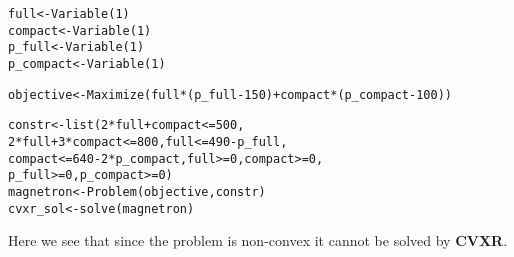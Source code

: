 \documentclass[a4paper]{article}\usepackage[]{graphicx}\usepackage[]{color}
\makeatletter
\newcommand{\hlnum}[1]{\textcolor[rgb]{0,0,0}{#1}}%
\newcommand{\hlopt}[1]{\textcolor[rgb]{0,0,0}{#1}}%
\newcommand{\hlstd}[1]{\textcolor[rgb]{0,0,0}{#1}}%
\newcommand{\hlkwb}[1]{\textcolor[rgb]{0.125,0.537,0.125}{#1}}%
\newcommand{\hlkwd}[1]{\textcolor[rgb]{0,0,0}{#1}}%
\newenvironment{kframe}{%
 \def\at@end@of@kframe{}%
 \ifinner\ifhmode%
  \def\at@end@of@kframe{\end{minipage}}%
  \begin{minipage}{\columnwidth}%
 \fi\fi%
 \def\FrameCommand##1{\hskip\@totalleftmargin \hskip-\fboxsep
 \colorbox{shadecolor}{##1}\hskip-\fboxsep
     \hskip-\linewidth \hskip-\@totalleftmargin \hskip\columnwidth}%
 \MakeFramed {\advance\hsize-\width
   \@totalleftmargin\z@ \linewidth\hsize
   \@setminipage}}%
 {\par\unskip\endMakeFramed%
 \at@end@of@kframe}
\newenvironment{knitrout}{}{} %
\newcommand{\pkg}[1]{\textbf{#1}}
\makeatother
\begin{document}
\begin{knitrout}
\color{fgcolor}\begin{kframe}
\begin{alltt}
\hlstd{full} \hlkwb{<-} \hlkwd{Variable}\hlstd{(}\hlnum{1}\hlstd{)}
\hlstd{compact} \hlkwb{<-} \hlkwd{Variable}\hlstd{(}\hlnum{1}\hlstd{)}
\hlstd{p_full} \hlkwb{<-} \hlkwd{Variable}\hlstd{(}\hlnum{1}\hlstd{)}
\hlstd{p_compact} \hlkwb{<-} \hlkwd{Variable}\hlstd{(}\hlnum{1}\hlstd{)}

\hlstd{objective} \hlkwb{<-} \hlkwd{Maximize}\hlstd{(full} \hlopt{*} \hlstd{(p_full} \hlopt{-} \hlnum{150}\hlstd{)} \hlopt{+} \hlstd{compact} \hlopt{*} \hlstd{(p_compact} \hlopt{-} \hlnum{100}\hlstd{))}
\end{alltt}


{\ttfamily\noindent\color{warningcolor}{\#\# Warning in full * (p\_full - 150): Forming a non-convex expression (affine) * (affine)}}

{\ttfamily\noindent\color{warningcolor}{\#\# Warning in compact * (p\_compact - 100): Forming a non-convex expression (affine) * (affine)}}\begin{alltt}
\hlstd{constr} \hlkwb{<-} \hlkwd{list}\hlstd{(}\hlnum{2} \hlopt{*} \hlstd{full} \hlopt{+} \hlstd{compact} \hlopt{<=} \hlnum{500}\hlstd{,}
    \hlnum{2} \hlopt{*} \hlstd{full} \hlopt{+} \hlnum{3} \hlopt{*} \hlstd{compact} \hlopt{<=} \hlnum{800}\hlstd{, full} \hlopt{<=} \hlnum{490} \hlopt{-} \hlstd{p_full,}
    \hlstd{compact} \hlopt{<=} \hlnum{640} \hlopt{-} \hlnum{2} \hlopt{*} \hlstd{p_compact, full} \hlopt{>=} \hlnum{0}\hlstd{, compact} \hlopt{>=} \hlnum{0}\hlstd{,}
    \hlstd{p_full} \hlopt{>=} \hlnum{0}\hlstd{, p_compact} \hlopt{>=} \hlnum{0}\hlstd{)}
\hlstd{magnetron} \hlkwb{<-} \hlkwd{Problem}\hlstd{(objective, constr)}
\hlstd{cvxr_sol} \hlkwb{<-} \hlkwd{solve}\hlstd{(magnetron)}
\end{alltt}


{\ttfamily\noindent\bfseries\color{errorcolor}{\#\# Error in CVXR::psolve(a, b, ...): Problem does not follow DCP rules.}}\end{kframe}
\end{knitrout}

Here we see that since the problem is non-convex it cannot be solved 
by \pkg{CVXR}. \\
\end{document}
